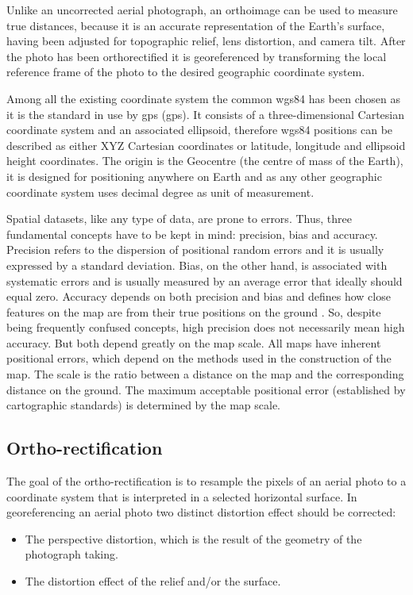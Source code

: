 Unlike an uncorrected aerial photograph, an orthoimage can be used to measure true distances, because it is an accurate representation of the Earth's surface, having been adjusted for topographic relief, lens distortion, and camera tilt.
After the photo has been orthorectified it is georeferenced by transforming the local reference frame of the photo to the desired geographic coordinate system.\par
Among all the existing coordinate system the common \acrshort{wgs84} has been chosen as it is the standard in use by \acrshort{gps} (\acrlong{gps}). It consists of a three-dimensional Cartesian coordinate system and an associated ellipsoid, therefore \acrshort{wgs84} positions can be described as either XYZ Cartesian coordinates or latitude, longitude and ellipsoid height coordinates. The origin is the Geocentre (the centre of mass of the Earth), it is designed for positioning anywhere on Earth and as any other geographic coordinate system uses decimal degree as unit of measurement.\par
{}
Spatial datasets, like any type of data, are prone to errors. Thus, three fundamental concepts have to be kept in mind: precision, bias and accuracy. Precision refers to the dispersion of positional random errors and it is usually expressed by a standard deviation. Bias, on the other hand, is associated with systematic errors and is usually measured by an average error that ideally should equal zero. Accuracy depends on both precision and bias and defines how close features on the map are from their true positions on the ground \cite{geoInformationSystem}. So, despite being frequently confused concepts, high precision does not necessarily mean high accuracy. But both depend greatly on the map scale. All maps have inherent positional errors, which depend on the methods used in the construction of the map. The scale is the ratio between a distance on the map and the corresponding distance on the ground. The maximum acceptable positional error (established by cartographic standards) is determined by the map scale.

\subsection{Ortho-rectification} %
\label{sub:ortho_rectification}
The goal of the ortho-rectification is to resample the pixels of an aerial photo to a coordinate system that is interpreted in a selected horizontal surface.
In georeferencing an aerial photo two distinct distortion effect should be corrected:
\begin{itemize}
	\item The perspective distortion, which is the result of the geometry of the photograph taking.
	\item The distortion effect of the relief and/or the surface.
\end{itemize}

